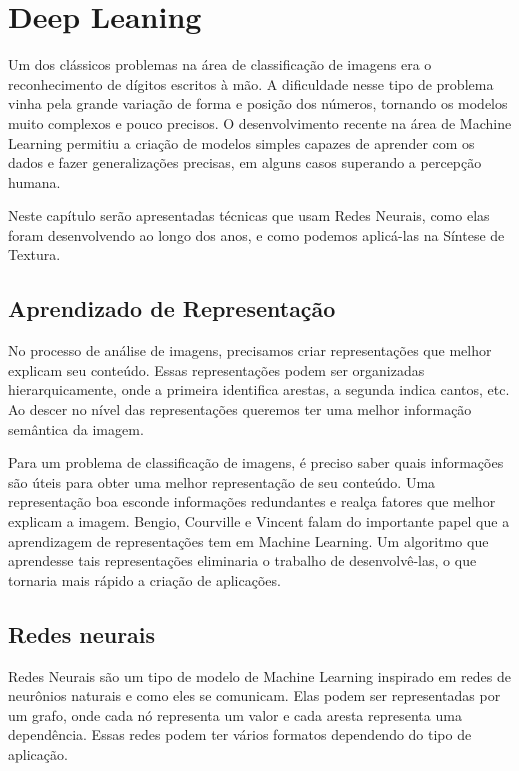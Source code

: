 \chapter{Deep Leaning}


Um dos clássicos problemas na área
de classificação de imagens era o
reconhecimento de dígitos
escritos à mão. 
A dificuldade nesse tipo de problema
vinha pela grande variação de forma
e posição dos números, tornando 
os modelos muito complexos e pouco
precisos. O desenvolvimento
recente na área de Machine Learning
permitiu a criação de modelos
simples capazes de aprender com
os dados e fazer generalizações
precisas, em alguns casos
superando a percepção humana.

Neste capítulo serão apresentadas
técnicas que usam Redes Neurais,
como elas foram desenvolvendo
ao longo dos anos, e como podemos
aplicá-las na Síntese de Textura.



\section{Aprendizado de Representação}


No processo de análise de imagens,
precisamos criar representações
que melhor explicam seu conteúdo.
Essas representações podem ser organizadas
hierarquicamente, onde
a primeira identifica
arestas, a segunda indica cantos, etc.
Ao descer no nível das representações
queremos ter uma melhor informação
semântica da imagem.


Para um problema de classificação de imagens,
é preciso saber quais informações são 
úteis para obter uma melhor 
representação de seu conteúdo. 
Uma representação boa esconde informações
redundantes e realça fatores que 
melhor explicam a imagem.
Bengio, Courville e Vincent
\cite{Bengio2014} falam do importante
papel que a aprendizagem
de representações tem em Machine Learning.
Um algoritmo que aprendesse tais representações
eliminaria o trabalho de desenvolvê-las,
o que tornaria mais rápido a criação de aplicações.


\section{Redes neurais}



Redes Neurais são um tipo 
de modelo de Machine Learning inspirado
em redes de neurônios naturais e como
eles se comunicam. Elas podem ser
representadas por um grafo, onde
cada nó representa um valor e cada aresta
representa uma dependência. Essas
redes podem ter vários formatos
dependendo do tipo de aplicação.

